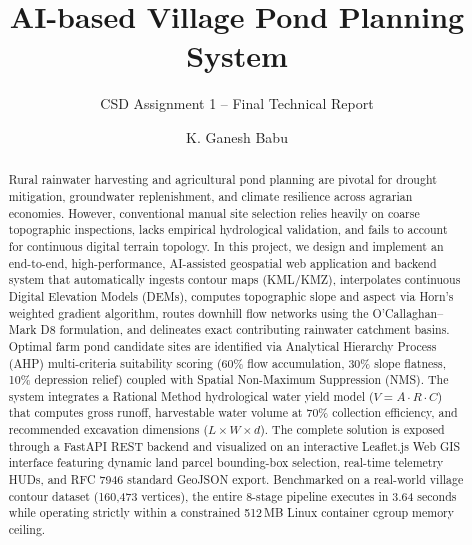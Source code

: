 \documentclass[manuscript,screen,review]{acmart}
\begin{document}
\title{AI-based Village Pond Planning System}
\subtitle{CSD Assignment 1 -- Final Technical Report}

\author{K. Ganesh Babu}

\renewcommand{\shortauthors}{Babu}

\begin{abstract}
Rural rainwater harvesting and agricultural pond planning are pivotal for drought mitigation, groundwater replenishment, and climate resilience across agrarian economies. However, conventional manual site selection relies heavily on coarse topographic inspections, lacks empirical hydrological validation, and fails to account for continuous digital terrain topology. In this project, we design and implement an end-to-end, high-performance, AI-assisted geospatial web application and backend system that automatically ingests contour maps (KML/KMZ), interpolates continuous Digital Elevation Models (DEMs), computes topographic slope and aspect via Horn's weighted gradient algorithm, routes downhill flow networks using the O'Callaghan--Mark D8 formulation, and delineates exact contributing rainwater catchment basins. Optimal farm pond candidate sites are identified via Analytical Hierarchy Process (AHP) multi-criteria suitability scoring (60\% flow accumulation, 30\% slope flatness, 10\% depression relief) coupled with Spatial Non-Maximum Suppression (NMS). The system integrates a Rational Method hydrological water yield model ($V = A \cdot R \cdot C$) that computes gross runoff, harvestable water volume at 70\% collection efficiency, and recommended excavation dimensions ($L \times W \times d$). The complete solution is exposed through a FastAPI REST backend and visualized on an interactive Leaflet.js Web GIS interface featuring dynamic land parcel bounding-box selection, real-time telemetry HUDs, and RFC 7946 standard GeoJSON export. Benchmarked on a real-world village contour dataset (160,473 vertices), the entire 8-stage pipeline executes in 3.64 seconds while operating strictly within a constrained 512\,MB Linux container cgroup memory ceiling.
\end{abstract}

\end{document}
